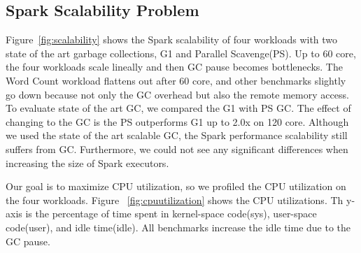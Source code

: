 \subsection{Spark Scalability Problem}
Figure~\ref{fig:scalability} shows the Spark scalability of four workloads with
two state of the art garbage collections, G1 and Parallel Scavenge(PS).
Up to 60 core, the four workloads scale lineally and then GC pause becomes bottlenecks.
The Word Count workload flattens out after 60 core, and other benchmarks slightly go
down because not only the GC overhead but also the remote memory access. 
To evaluate state of the art GC, we compared the G1 with PS GC.
The effect of changing to the GC is the PS outperforms G1 up to 2.0x on 120 core.
Although we used the state of the art scalable GC,
the Spark performance scalability still suffers from GC.
Furthermore, we could not see any significant differences when increasing the size
of Spark executors.


Our goal is to maximize CPU utilization, so we profiled the CPU utilization
on the four workloads.
Figure ~\ref{fig:cpuutilization} shows the CPU utilizations.
Th y-axis is the percentage of time spent in kernel-space code(sys), user-space
code(user), and idle time(idle).
All benchmarks increase the idle time due to the GC pause.

\ifkor
\else


